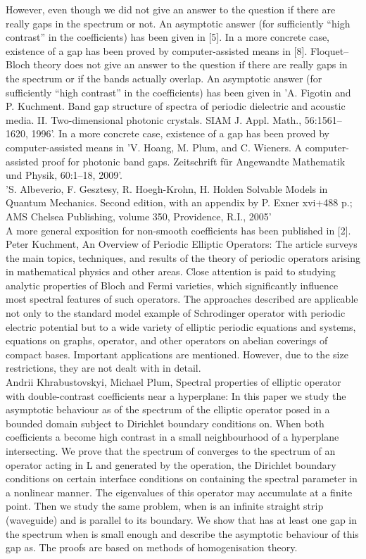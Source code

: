 	However, even though we did not give an answer to the question if there are really gaps in the spectrum or not. An asymptotic answer (for sufficiently “high contrast” in the coefficients) has been given in [5]. In a more concrete case, existence of a gap has been proved by computer-assisted means in [8]. Floquet–Bloch theory does not give an answer to the question if there are really gaps in the spectrum or if the bands actually overlap. An asymptotic answer (for sufficiently “high contrast” in the coefficients) has been given in 'A. Figotin and P. Kuchment. Band gap structure of spectra of periodic dielectric and acoustic media. II. Two-dimensional photonic crystals. SIAM J. Appl. Math., 56:1561–1620, 1996'. In a more concrete case, existence of a gap has been proved by computer-assisted means in 'V. Hoang, M. Plum, and C. Wieners. A computer-assisted proof for photonic band gaps. Zeitschrift für Angewandte Mathematik und Physik, 60:1–18, 2009'.
~\\
'S. Albeverio, F. Gesztesy, R. Hoegh-Krohn, H. Holden Solvable Models in Quantum Mechanics. Second edition, with an appendix by P. Exner xvi+488 p.; AMS Chelsea Publishing, volume 350, Providence, R.I., 2005'
~\\
A more general exposition for non-smooth coefficients has been published in [2].
~\\

Peter Kuchment, An Overview of Periodic Elliptic Operators: The article surveys the main topics, techniques, and results of the theory of periodic operators arising in mathematical physics and other areas. Close attention is paid to studying analytic properties of Bloch and Fermi varieties, which significantly influence most spectral features of such operators. The approaches described are applicable not only to the standard model example of Schrodinger operator with periodic electric potential but to a wide variety of elliptic periodic equations and systems, equations on graphs, operator, and other operators on abelian coverings of compact bases. Important applications are mentioned. However, due to the size restrictions, they are not dealt with in detail.
~\\

Andrii Khrabustovskyi, Michael Plum, Spectral properties of elliptic operator with double-contrast coefficients near a hyperplane: In this paper we study the asymptotic behaviour as of the spectrum of the elliptic operator posed in a bounded domain subject to Dirichlet boundary conditions on. When both coefficients a become high contrast in a small neighbourhood of a hyperplane intersecting. We prove that the spectrum of converges to the spectrum of an operator acting in L and generated by the operation, the Dirichlet boundary conditions on certain interface conditions on containing the spectral parameter in a nonlinear manner. The eigenvalues of this operator may accumulate at a finite point. Then we study the same problem, when is an infinite straight strip (waveguide) and is parallel to its boundary. We show that has at least one gap in the spectrum when is small enough and describe the asymptotic behaviour of this gap as. The proofs are based on methods of homogenisation theory.